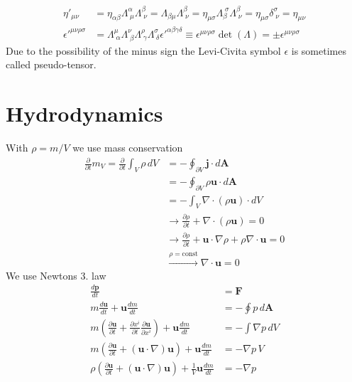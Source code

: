 \documentclass[../main.tex]{subfiles}
\begin{document}
\begin{align}
    \eta'_{\mu\nu} 
    &=\eta_{\alpha\beta}\Lambda^\alpha_{\;\mu} \Lambda^\beta_{\;\nu}
    =\Lambda_{\beta\mu} \Lambda^\beta_{\;\nu}
    =\eta_{\mu\sigma}\Lambda_{\beta}^{\;\sigma} \Lambda^\beta_{\;\nu}
    =\eta_{\mu\sigma}\delta^\sigma_{\;\nu}
    =\eta_{\mu\nu}\\
    {\epsilon'}^{\mu\nu\rho\sigma}
    &=\Lambda^\mu_{\;\alpha}\Lambda^\nu_{\;\beta}\Lambda^\rho_{\;\gamma}\Lambda^\sigma_{\;\delta}{\epsilon'}^{\alpha\beta\gamma\delta}\equiv \epsilon^{\mu\nu\rho\sigma} \det(\Lambda)=\pm \epsilon^{\mu\nu\rho\sigma}
\end{align}
Due to the possibility of the minus sign the Levi-Civita symbol $\epsilon$ is sometimes called pseudo-tensor.

\section{Hydrodynamics}
With $\rho=m/V$ we use mass conservation
\begin{align}
\frac{\partial}{\partial t}m_V
=\frac{\partial}{\partial t}\int_V \rho\,dV
&=-\oint_{\partial V} \mathbf{j}\cdot d\mathbf{A}\\
&=-\oint_{\partial V} \rho\mathbf{u}\cdot d\mathbf{A}\\
&=-\int_V \nabla\cdot(\rho\mathbf{u})\cdot dV\\
&\rightarrow\frac{\partial\rho}{\partial t}+\nabla\cdot(\rho\mathbf{u})=0\\
&\rightarrow\frac{\partial\rho}{\partial t}+\mathbf{u}\cdot\nabla\rho+\rho\nabla\cdot\mathbf{u}=0\\
&\overset{\rho=\text{const}}{\rightarrow}\nabla\cdot\mathbf{u}=0
\end{align}
We use Newtons 3. law
\begin{align}
\frac{d\mathbf{p}}{dt}&=\mathbf{F}\\
m\frac{d\mathbf{u}}{dt}+\mathbf{u}\frac{dm}{dt}&=-\oint p\,d\mathbf{A}\\
m\left(\frac{\partial\mathbf{u}}{\partial t}+\frac{\partial x^i}{\partial t}\frac{\partial\mathbf{u}}{\partial x^i}\right)+\mathbf{u}\frac{dm}{dt}&=-\int \nabla p\,dV\\
m\left(\frac{\partial\mathbf{u}}{\partial t}+(\mathbf{u}\cdot\nabla)\mathbf{u}\right)+\mathbf{u}\frac{dm}{dt}&=-\nabla p\,V\\
\rho\left(\frac{\partial\mathbf{u}}{\partial t}+(\mathbf{u}\cdot\nabla)\mathbf{u}\right)+\frac{1}{V}\mathbf{u}\frac{dm}{dt}&=-\nabla p
\end{align}
\end{document}
